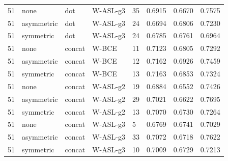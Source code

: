 \begin{longtable}{rllllrrr}
51 & none & dot & W-ASL-g3 & 35 & 0.6915 & 0.6670 & 0.7575 \\
51 & asymmetric & dot & W-ASL-g3 & 24 & 0.6694 & 0.6806 & 0.7230 \\
51 & symmetric & dot & W-ASL-g3 & 24 & 0.6785 & 0.6761 & 0.6964 \\
51 & none & concat & W-BCE & 11 & 0.7123 & 0.6805 & 0.7292 \\
51 & asymmetric & concat & W-BCE & 12 & 0.7162 & 0.6926 & 0.7459 \\
51 & symmetric & concat & W-BCE & 13 & 0.7163 & 0.6853 & 0.7324 \\
51 & none & concat & W-ASL-g2 & 19 & 0.6884 & 0.6552 & 0.7426 \\
51 & asymmetric & concat & W-ASL-g2 & 29 & 0.7021 & 0.6622 & 0.7695 \\
51 & symmetric & concat & W-ASL-g2 & 13 & 0.7070 & 0.6730 & 0.7264 \\
51 & none & concat & W-ASL-g3 & 5 & 0.6769 & 0.6741 & 0.7029 \\
51 & asymmetric & concat & W-ASL-g3 & 33 & 0.7072 & 0.6718 & 0.7622 \\
51 & symmetric & concat & W-ASL-g3 & 10 & 0.7009 & 0.6729 & 0.7213 \\
\end{longtable}
